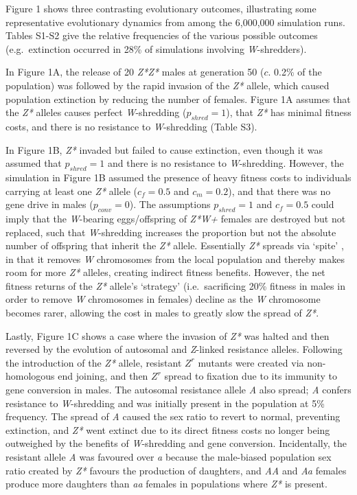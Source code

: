 \documentclass[]{rsos}%
\begin{document}
Figure 1 shows three contrasting evolutionary outcomes, illustrating
some representative evolutionary dynamics from among the 6,000,000
simulation runs. Tables S1-S2 give the relative frequencies of the
various possible outcomes (e.g.~extinction occurred in 28\% of
simulations involving \emph{W}-shredders).

In Figure 1A, the release of 20 \emph{Z*Z*} males at generation 50
(\(c\). 0.2\% of the population) was followed by the rapid invasion of
the \emph{Z*} allele, which caused population extinction by reducing the
number of females. Figure 1A assumes that the \emph{Z*} alleles causes
perfect \emph{W}-shredding (\(p_{shred} = 1\)), that \emph{Z*} has
minimal fitness costs, and there is no resistance to \emph{W}-shredding
(Table S3).

In Figure 1B, \emph{Z*} invaded but failed to cause extinction, even
though it was assumed that \(p_{shred} = 1\) and there is no resistance
to \emph{W}-shredding. However, the simulation in Figure 1B assumed the
presence of heavy fitness costs to individuals carrying at least one
\emph{Z*} allele (\(c_f = 0.5\) and \(c_m = 0.2\)), and that there was
no gene drive in males (\(p_{conv} = 0\)). The assumptions
\(p_{shred} = 1\) and \(c_f = 0.5\) could imply that the
\emph{W}-bearing eggs/offspring of \emph{Z*W+} females are destroyed but
not replaced, such that \emph{W}-shredding increases the proportion but
not the absolute number of offspring that inherit the \emph{Z*} allele.
Essentially \emph{Z*} spreads via `spite' \citep{gardner2006sp}, in that
it removes \emph{W} chromosomes from the local population and thereby
makes room for more \emph{Z*} alleles, creating indirect fitness
benefits. However, the net fitness returns of the \emph{Z*} allele's
`strategy' (i.e.~sacrificing 20\% fitness in males in order to remove
\emph{W} chromosomes in females) decline as the \emph{W} chromosome
becomes rarer, allowing the cost in males to greatly slow the spread of
\emph{Z*}.

Lastly, Figure 1C shows a case where the invasion of \emph{Z*} was
halted and then reversed by the evolution of autosomal and
\emph{Z}-linked resistance alleles. Following the introduction of the
\emph{Z*} allele, resistant \(Z^r\) mutants were created via
non-homologous end joining, and then \(Z^r\) spread to fixation due to
its immunity to gene conversion in males. The autosomal resistance
allele \emph{A} also spread; \emph{A} confers resistance to
\emph{W}-shredding and was initially present in the population at 5\%
frequency. The spread of \emph{A} caused the sex ratio to revert to
normal, preventing extinction, and \emph{Z*} went extinct due to its
direct fitness costs no longer being outweighed by the benefits of
\emph{W}-shredding and gene conversion. Incidentally, the resistant
allele \emph{A} was favoured over \emph{a} because the male-biased
population sex ratio created by \emph{Z*} favours the production of
daughters, and \emph{AA} and \emph{Aa} females produce more daughters
than \emph{aa} females in populations where \emph{Z*} is present.
\end{document}
